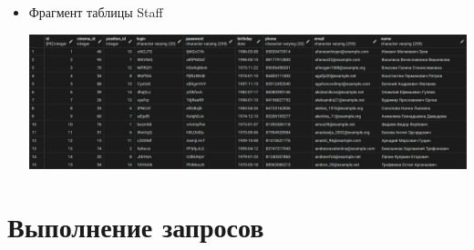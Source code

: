 \documentclass[a4paper,12pt]{article}
\renewcommand{\^}[2]{#1^{\, #2} \kern -1pt}
\newcommand{\1}{\kern 1pt}
\newcommand{\0}{\kern -1pt}
\begin{document}
\begin{itemize}
	
	\item Фрагмент таблицы Staff
	
	\includegraphics[scale=0.24,page=1]{Staff.png}
	
	
		
	\end{itemize}
	
	\newpage
	
	\section{Выполнение запросов}
	
	
\end{document}
